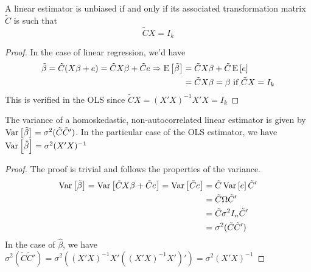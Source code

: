 \begin{proposition}
A linear estimator is unbiased if and only if its associated transformation matrix $\tilde{C}$ is such that $$\tilde{C}X = I_k$$
\end{proposition}
\begin{proof}
In the case of linear regression, we'd have \begin{align*}
\tilde{\beta} = \tilde{C}(X\beta + e) = \tilde{C}X\beta + \tilde{C}e \Rightarrow \operatorname{E}\left[\tilde{\beta}\right] & = \tilde{C}X\beta + \tilde{C}\operatorname{E}\left[e\right] \\
& = \tilde{C}X\beta = \beta \text{ if } \tilde{C}X = I_k
\end{align*}This is verified in the OLS since $\tilde{C}X = (X'X)^{-1}X'X = I_k$
\end{proof}

\begin{proposition}
The variance of a homoskedastic, non-autocorrelated linear estimator is given by $\operatorname{Var}\left[\tilde{\beta}\right] =  \sigma^2(\tilde{C}\tilde{C}')$. In the particular case of the OLS estimator, we have $\operatorname{Var}\left[\hat{\beta}\right] = \sigma^2(X'X)^{-1}$
\end{proposition}
\begin{proof}
The proof is trivial and follows the properties of the variance.
\begin{align*}
\operatorname{Var}\left[\tilde{\beta}\right] = \operatorname{Var}\left[\tilde{C}X\beta + \tilde{C}e\right] = \operatorname{Var}\left[\tilde{C}e\right] & = \tilde{C}\operatorname{Var}\left[e\right]\tilde{C}'\\
& = \tilde{C}\Omega\tilde{C}'\\
& = \tilde{C}\sigma^2 I_n\tilde{C}'\\
& = \sigma^2(\tilde{C}\tilde{C}')
\end{align*}
In the case of $\hat\beta$, we have $\sigma^2(\tilde{C}\tilde{C}') = \sigma^2((X'X)^{-1}X'((X'X)^{-1}X')') = \sigma^2(X'X)^{-1}$
\end{proof}

